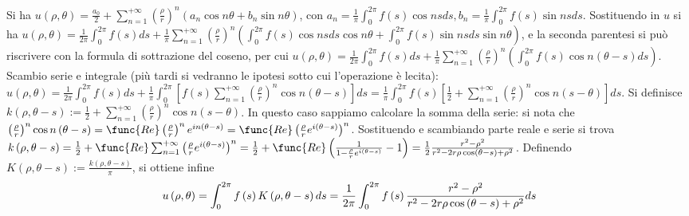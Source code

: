 \documentclass{article}
\begin{document}
Si ha $u\left( \rho ,\theta \right) =\frac{a_{0}}{2}+\sum_{n=1}^{+\infty
}\left( \frac{\rho }{r}\right) ^{n}\left( a_{n}\cos n\theta +b_{n}\sin
n\theta \right) $, con $a_{n}=\frac{1}{\pi }\int_{0}^{2\pi }f\left( s\right)
\cos nsds,b_{n}=\frac{1}{\pi }\int_{0}^{2\pi }f\left( s\right) \sin nsds$.
Sostituendo in $u$ si ha $u\left( \rho ,\theta \right) =\frac{1}{2\pi }%
\int_{0}^{2\pi }f\left( s\right) ds+\frac{1}{\pi }\sum_{n=1}^{+\infty
}\left( \frac{\rho }{r}\right) ^{n}\left( \int_{0}^{2\pi }f\left( s\right)
\cos nsds\cos n\theta +\int_{0}^{2\pi }f\left( s\right) \sin nsds\sin
n\theta \right) $, e la seconda parentesi si pu\`{o} riscrivere con la
formula di sottrazione del coseno, per cui $u\left( \rho ,\theta \right) =%
\frac{1}{2\pi }\int_{0}^{2\pi }f\left( s\right) ds+\frac{1}{\pi }%
\sum_{n=1}^{+\infty }\left( \frac{\rho }{r}\right) ^{n}\left( \int_{0}^{2\pi
}f\left( s\right) \cos n\left( \theta -s\right) ds\right) $. Scambio serie e
integrale (pi\`{u} tardi si vedranno le ipotesi sotto cui l'operazione \`{e}
lecita): $u\left( \rho ,\theta \right) =\frac{1}{2\pi }\int_{0}^{2\pi
}f\left( s\right) ds+\frac{1}{\pi }\int_{0}^{2\pi }\left[ f\left( s\right)
\sum_{n=1}^{+\infty }\left( \frac{\rho }{r}\right) ^{n}\cos n\left( \theta
-s\right) \right] ds=\frac{1}{\pi }\int_{0}^{2\pi }f\left( s\right) \left[ 
\frac{1}{2}+\sum_{n=1}^{+\infty }\left( \frac{\rho }{r}\right) ^{n}\cos
n\left( s-\theta \right) \right] ds$. Si definisce $k\left( \rho ,\theta
-s\right) :=\frac{1}{2}+\sum_{n=1}^{+\infty }\left( \frac{\rho }{r}\right)
^{n}\cos n\left( s-\theta \right) $. In questo caso sappiamo calcolare la
somma della serie: si nota che $\left( \frac{\rho }{r}\right) ^{n}\cos
n\left( \theta -s\right) =\func{Re}\left( \frac{\rho }{r}\right)
^{n}e^{in\left( \theta -s\right) }=\func{Re}\left( \frac{\rho }{r}e^{i\left(
\theta -s\right) }\right) ^{n}$. Sostituendo e scambiando parte reale e
serie si trova $k\left( \rho ,\theta -s\right) =\frac{1}{2}+\func{Re}%
\sum_{n=1}^{+\infty }\left( \frac{\rho }{r}e^{i\left( \theta -s\right)
}\right) ^{n}=\frac{1}{2}+\func{Re}\left( \frac{1}{1-\frac{\rho }{r}%
e^{i\left( \theta -s\right) }}-1\right) =\frac{1}{2}\frac{r^{2}-\rho ^{2}}{%
r^{2}-2r\rho \cos \left( \theta -s\right) +\rho ^{2}}$. Definendo $K\left(
\rho ,\theta -s\right) :=\frac{k\left( \rho ,\theta -s\right) }{\pi }$, si
ottiene infine%
\begin{equation*}
u\left( \rho ,\theta \right) =\int_{0}^{2\pi }f\left( s\right) K\left( \rho
,\theta -s\right) ds=\frac{1}{2\pi }\int_{0}^{2\pi }f\left( s\right) \frac{%
r^{2}-\rho ^{2}}{r^{2}-2r\rho \cos \left( \theta -s\right) +\rho ^{2}}ds
\end{equation*}
\end{document}
